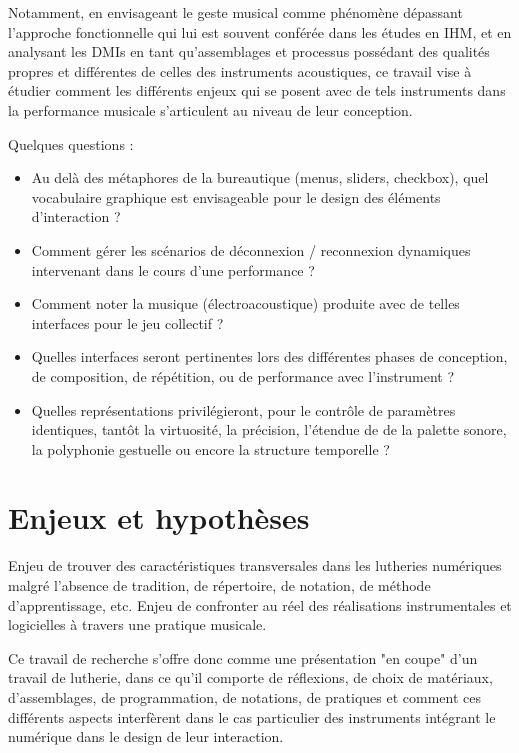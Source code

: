Notamment, en envisageant le geste musical comme phénomène dépassant l'approche fonctionnelle qui lui est souvent conférée dans les études en \gls{IHM}, et en analysant les \glspl{DMI} en tant qu'assemblages et processus possédant des qualités propres et différentes de celles des instruments acoustiques, ce travail vise à étudier comment les différents enjeux qui se posent avec de tels instruments dans la performance musicale s'articulent au niveau de leur conception.

Quelques questions : 
\vspace{-1em}
\begin{itemize}[noitemsep]
\item Au delà des métaphores de la bureautique (menus, sliders, checkbox), quel vocabulaire graphique est envisageable pour le design des éléments d'interaction ?
\item Comment gérer les scénarios de déconnexion / reconnexion dynamiques intervenant dans le cours d'une performance ?
\item Comment noter la musique (électroacoustique) produite avec de telles interfaces pour le jeu collectif ?
\item Quelles interfaces seront pertinentes lors des différentes phases de conception, de composition, de répétition, ou de performance avec l'instrument ?
\item  Quelles représentations privilégieront, pour le contrôle de paramètres identiques, tantôt la virtuosité, la précision, l'étendue de de la palette sonore, la polyphonie gestuelle ou encore la structure temporelle ?
\end{itemize}

\section{Enjeux et hypothèses}

Enjeu de trouver des caractéristiques transversales dans les lutheries numériques malgré l'absence de tradition, de répertoire, de notation, de méthode d'apprentissage, etc.
Enjeu de confronter au réel des réalisations instrumentales et logicielles à travers une pratique musicale.

Ce travail de recherche s'offre donc comme une présentation "en coupe" d'un travail de lutherie, dans ce qu'il comporte de réflexions, de choix de matériaux, d'assemblages, de programmation, de notations, de pratiques et comment ces différents aspects interfèrent dans le cas particulier des instruments intégrant le numérique dans le design de leur interaction.

